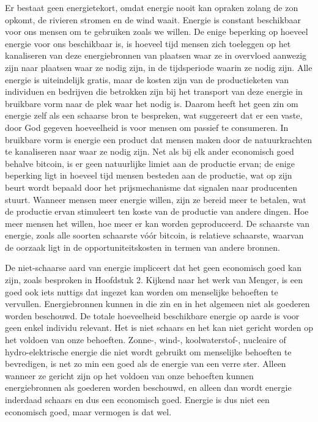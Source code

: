 Er bestaat geen energietekort, omdat energie nooit kan opraken zolang de zon opkomt, de rivieren stromen en de wind waait. Energie is constant beschikbaar voor ons mensen om te gebruiken zoals we willen. De enige beperking op hoeveel energie voor ons beschikbaar is, is hoeveel tijd mensen zich toeleggen op het kanaliseren van deze energiebronnen van plaatsen waar ze in overvloed aanwezig zijn naar plaatsen waar ze nodig zijn, in de tijdsperiode waarin ze nodig zijn. Alle energie is uiteindelijk gratis, maar de kosten zijn van de productieketen van individuen en bedrijven die betrokken zijn bij het transport van deze energie in bruikbare vorm naar de plek waar het nodig is. Daarom heeft het geen zin om energie zelf als een schaarse bron te bespreken, wat suggereert dat er een vaste, door God gegeven hoeveelheid is voor mensen om passief te consumeren. In bruikbare vorm is energie een product dat mensen maken door de natuurkrachten te kanaliseren naar waar ze nodig zijn. Net als bij elk ander economisch goed behalve bitcoin, is er geen natuurlijke limiet aan de productie ervan; de enige beperking ligt in hoeveel tijd mensen besteden aan de productie, wat op zijn beurt wordt bepaald door het prijsmechanisme dat signalen naar producenten stuurt. Wanneer mensen meer energie willen, zijn ze bereid meer te betalen, wat de productie ervan stimuleert ten koste van de productie van andere dingen. Hoe meer mensen het willen, hoe meer er kan worden geproduceerd. De schaarste van energie, zoals alle soorten schaarste vóór bitcoin, is relatieve schaarste, waarvan de oorzaak ligt in de opportuniteitskosten in termen van andere bronnen.

De niet-schaarse aard van energie impliceert dat het geen economisch goed kan zijn, zoals besproken in Hoofdstuk 2. Kijkend naar het werk van Menger, is een goed ook iets nuttigs dat ingezet kan worden om menselijke behoeften te vervullen. Energiebronnen kunnen in die zin en in het algemeen niet als goederen worden beschouwd. De totale hoeveelheid beschikbare energie op aarde is voor geen enkel individu relevant. Het is niet schaars en het kan niet gericht worden op het voldoen van onze behoeften. \newline Zonne-, wind-, koolwaterstof-, nucleaire of hydro-elektrische energie die niet wordt gebruikt om menselijke behoeften te bevredigen, is net zo min een goed als de energie van een verre ster. Alleen wanneer ze gericht zijn op het voldoen van onze behoeften kunnen energiebronnen als goederen worden beschouwd, en alleen dan wordt energie inderdaad schaars en dus een economisch goed. Energie is dus niet een economisch goed, maar vermogen is dat wel.

